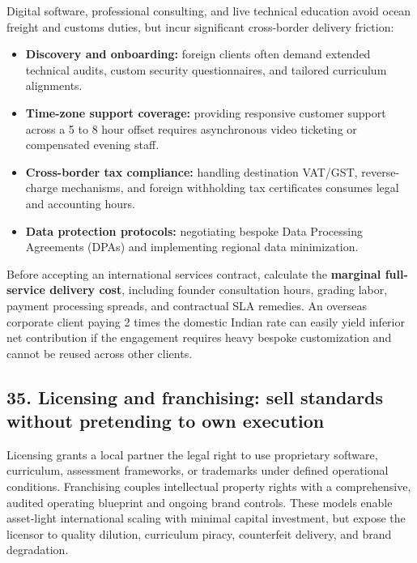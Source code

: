 Digital software, professional consulting, and live technical education avoid ocean freight and customs duties, but incur significant cross-border delivery friction:
\begin{itemize}
    \item \textbf{Discovery and onboarding:} foreign clients often demand extended technical audits, custom security questionnaires, and tailored curriculum alignments.
    \item \textbf{Time-zone support coverage:} providing responsive customer support across a 5 to 8 hour offset requires asynchronous video ticketing or compensated evening staff.
    \item \textbf{Cross-border tax compliance:} handling destination VAT/GST, reverse-charge mechanisms, and foreign withholding tax certificates consumes legal and accounting hours.
    \item \textbf{Data protection protocols:} negotiating bespoke Data Processing Agreements (DPAs) and implementing regional data minimization.
\end{itemize}

Before accepting an international services contract, calculate the \textbf{marginal full-service delivery cost}, including founder consultation hours, grading labor, payment processing spreads, and contractual SLA remedies. An overseas corporate client paying 2 times the domestic Indian rate can easily yield inferior net contribution if the engagement requires heavy bespoke customization and cannot be reused across other clients.

\subsection{35. Licensing and franchising: sell standards without pretending to own execution}

Licensing grants a local partner the legal right to use proprietary software, curriculum, assessment frameworks, or trademarks under defined operational conditions. Franchising couples intellectual property rights with a comprehensive, audited operating blueprint and ongoing brand controls. These models enable asset-light international scaling with minimal capital investment, but expose the licensor to quality dilution, curriculum piracy, counterfeit delivery, and brand degradation.

